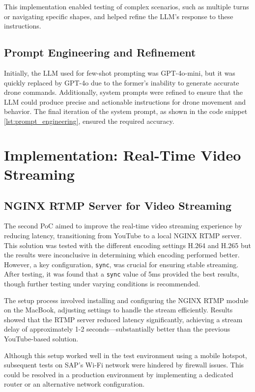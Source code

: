 This implementation enabled testing of complex scenarios, such as multiple turns or navigating specific shapes, and helped refine the \ac{LLM}'s response to these instructions.

\subsection{Prompt Engineering and Refinement}
Initially, the \ac{LLM} used for few-shot prompting was GPT-4o-mini, but it was quickly replaced by GPT-4o due to the former's inability to generate accurate drone commands. 
Additionally, system prompts were refined to ensure that the \ac{LLM} could produce precise and actionable instructions for drone movement and behavior. 
The final iteration of the system prompt, as shown in the code snippet \ref{lst:prompt_engineering}, ensured the required accuracy.

\section{Implementation: Real-Time Video Streaming}
\subsection{NGINX RTMP Server for Video Streaming}
The second \ac{PoC} aimed to improve the real-time video streaming experience by reducing latency, transitioning from YouTube to a local NGINX \ac{RTMP} server. 
This solution was tested with the different encoding settings H.264 and H.265 but the results were inconclusive in determining which encoding performed better. 
However, a key configuration, \texttt{sync}, was crucial for ensuring stable streaming. After testing, it was found that a \texttt{sync} value of 5ms provided the best results, 
though further testing under varying conditions is recommended.

The setup process involved installing and configuring the NGINX \ac{RTMP} module on the MacBook, adjusting settings to handle the stream efficiently. 
Results showed that the \ac{RTMP} server reduced latency significantly, achieving a stream delay of approximately 1-2 seconds—substantially better than the previous YouTube-based solution.

Although this setup worked well in the test environment using a mobile hotspot, subsequent tests on SAP's Wi-Fi network were hindered by firewall issues. 
This could be resolved in a production environment by implementing a dedicated router or an alternative network configuration.

